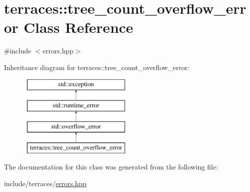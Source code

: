 \hypertarget{classterraces_1_1tree__count__overflow__error}{}\section{terraces\+:\+:tree\+\_\+count\+\_\+overflow\+\_\+error Class Reference}
\label{classterraces_1_1tree__count__overflow__error}


{\ttfamily \#include $<$errors.\+hpp$>$}

Inheritance diagram for terraces\+:\+:tree\+\_\+count\+\_\+overflow\+\_\+error\+:\begin{figure}[H]
\begin{center}
\leavevmode
\includegraphics[height=4.000000cm]{classterraces_1_1tree__count__overflow__error}
\end{center}
\end{figure}


The documentation for this class was generated from the following file\+:\begin{DoxyCompactItemize}
\item 
include/terraces/\hyperlink{errors_8hpp}{errors.\+hpp}\end{DoxyCompactItemize}
